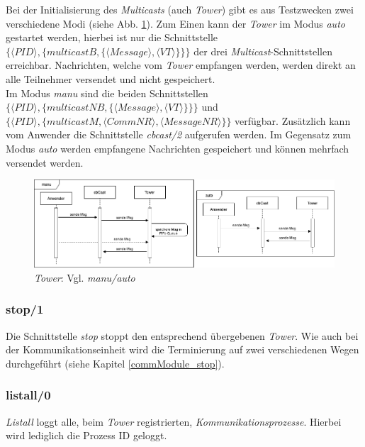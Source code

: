Bei der Initialisierung des \textit{Multicasts} (auch \textit{Tower}) gibt es aus Testzwecken zwei verschiedene Modi (siehe Abb. \ref{fig:sequence_tower_init}). Zum Einen kann der \textit{Tower} im Modus \textit{auto} gestartet werden, hierbei ist nur die Schnittstelle $\{\langle PID\rangle,\{multicastB,\{\langle Message\rangle,\langle VT\rangle\}\}\}$ der drei \textit{Multicast}-Schnittstellen erreichbar. Nachrichten, welche vom \textit{Tower} empfangen werden, werden direkt an alle Teilnehmer versendet und nicht gespeichert.\\
Im Modus \textit{manu} sind die beiden Schnittstellen $\{\langle PID\rangle,\{multicastNB,\{\langle Message\rangle,\langle VT\rangle\}\}\}$ und $\{\langle PID\rangle,\{multicastM,\langle CommNR\rangle,\langle MessageNR\rangle\}\}$ verfügbar. Zusätzlich kann vom Anwender die Schnittstelle \textit{cbcast/2} aufgerufen werden. Im Gegensatz zum Modus \textit{auto} werden empfangene Nachrichten gespeichert und können mehrfach versendet werden.

\begin{figure}[htbp]
\begin{center}
\includegraphics[scale=0.45]{Latex/Bilder/towerCBC_init.png}
\caption{\label{fig:sequence_tower_init} \textit{Tower}: Vgl. \textit{manu/auto}}
\end{center}
\end{figure}


\subsubsection{stop/1}

Die Schnittstelle \textit{stop} stoppt den entsprechend übergebenen \textit{Tower}. Wie auch bei der Kommunikationseinheit wird die Terminierung auf zwei verschiedenen Wegen durchgeführt (siehe Kapitel \ref{commModule_stop}).

\subsubsection{listall/0}

\textit{Listall} loggt alle, beim \textit{Tower} registrierten, \textit{Kommunikationsprozesse}. Hierbei wird lediglich die Prozess ID geloggt.

